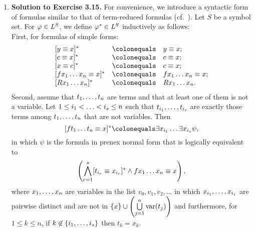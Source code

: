 \begin{enumerate}[1.]
\begin{enumerate}[(a)]
\begin{proof}
\ \\
For the direction from (2) to (3), the argument is analogous to that of 3.10: Because of the forth-property of the sequence $(K_n)_{n \in \nat}$ (see (IV)(ii) in part (b)), if $K_m \neq \emptyset$, then also $K_n \neq \emptyset$ for $n < m$.\\
\ \\
Finally, notice that in case $(I_n)_{n \leq m}: \struct{A} \emb_m \struct{B}$, the proof of (V) in part (b) shows that each $p \in I_n$ (with $n \leq m$) preserves the validity of universal formulas of quantifier rank $\leq n$ in $\struct{A}$ provided that these formulas hold in $\struct{B}$ (cf.\ the discussion before 3.3). Hence, analogous to 3.3, we obtain the direction from (3) to (1).
\end{proof}
\end{enumerate}
%
\item \textbf{Solution to Exercise 3.15.} For convenience, we introduce a syntactic form of formulas similar to that of term-reduced formulas (cf.\ ). Let $S$ be a symbol set. For $\varphi \in \fstordlang{S}$, we define $\varphi^\ast \in \fstordlang{S}$ inductively as follows:\smallskip\\
First, for formulas of simple forms:
\[
\begin{array}{lll}
[y \equal x]^\ast & \colonequals & y \equal x; \cr
[c \equal x]^\ast & \colonequals & c \equal x; \cr
[x \equal c]^\ast & \colonequals & c \equal x; \cr
[f\enum[1]{x}{n} \equal x]^\ast & \colonequals & f\enum[1]{x}{n} \equal x; \cr
[R\enum[1]{x}{n}]^\ast & \colonequals & R\enum[1]{x}{n}.
\end{array}
\]
Second, assume that $\seq[1]{t}{n}$ are terms and that at least one of them is not a variable. Let $1 \leq \enumpop{i_1}{<}{i_s} \leq n$ such that $\seq[i_1]{t}{i_s}$ are exactly those terms among $\seq[1]{t}{n}$ that are not variables. Then
\[
[f\enum[1]{t}{n} \equal x]^\ast \colonequals \enump{\exists x_{i_1}}{\exists x_{i_s}}\psi,
\]
in which $\psi$ is the formula in prenex normal form that is logically equivalent to
\[
\parenadj{\bigwedge\limits^s_{r = 1} [t_{i_r} \equal x_{i_r}]^\ast \land f\enum[1]{x}{n} \equal x},
\]
where $\seq[1]{x}{n}$ are variables in the list $v_0, v_1, v_2, \ldots$ in which $\seq[i_1]{x}{i_s}$ are pairwise distinct and are not in $\{ x \} \cup \parenadj{\bigcup\limits^n_{j = 1}\var{t_j}}$ and furthermore, for $1 \leq k \leq n$, if $k \not\in \{ \seq[1]{i}{s} \}$ then $t_k = x_k$.\\
\ \\

\end{enumerate}
